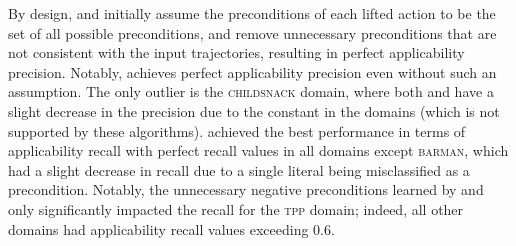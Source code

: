 


By design, \samshort{} and \offlam{} initially assume the preconditions of each lifted action to be the set of all possible preconditions, and remove unnecessary preconditions that are not consistent with the input trajectories, resulting in perfect applicability precision. Notably, \nolam{} achieves perfect applicability precision even without such an assumption.
The only outlier is the \textsc{childsnack} domain, where both \nolam{} and \offlam{} have a slight decrease in the precision due to the constant in the domains (which is not supported by these algorithms).
\offlam{} achieved the best performance in terms of applicability recall with perfect recall values in all domains except \textsc{barman}, which had a slight decrease in recall due to a single literal being misclassified as a precondition. 
Notably, the unnecessary negative preconditions learned by \samshort{} and \nolam{} only significantly impacted the recall for the \textsc{tpp} domain; indeed, all other domains had applicability recall values exceeding $0.6$. 


